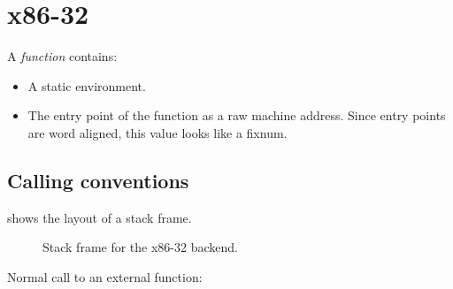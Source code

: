 \chapter{x86-32}
\label{chap-backend-x86}

A \emph{function} contains:

\begin{itemize}
\item A static environment.
\item The entry point of the function as a raw machine address.  Since
  entry points are word aligned, this value looks like a fixnum.
\end{itemize}

\section{Calling conventions}

 shows the layout of a stack frame.

\begin{figure}
\begin{center}
\end{center}
\caption{\label{fig-x86-32-stack-frame}
Stack frame for the x86-32 backend.}
\end{figure}

Normal call to an external function:

